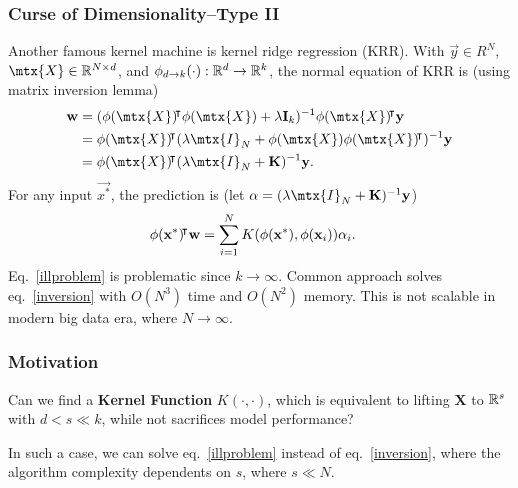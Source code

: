 \documentclass[10pt]{../formats/RU}
\begin{document}
\begin{frame}
  \frametitle{Curse of Dimensionality--Type II}
  Another famous kernel machine is kernel ridge regression (KRR). With $\vec{y}\in R^N$, $\mtx{X}\in\R^{N\times d}$, and $\phi_{d\rightarrow k}(\cdot):\mathbb{R}^d\rightarrow\mathbb{R}^k$,
  the normal equation of KRR is (using matrix inversion lemma)
  \begin{align}
    \vec{w} &= (\phi(\mtx{X})\trn\phi(\mtx{X})+\lambda\mathbf{I}_k)^{-1}\phi(\mtx{X})\trn\vec{y} \label{illproblem} \\
    &= \phi(\mtx{X})\trn(\lambda\mtx{I}_N+\phi(\mtx{X})\phi(\mtx{X})\trn)^{-1}\vec{y} \label{inversion}\\
    &= \phi(\mtx{X})\trn(\lambda\mtx{I}_N+\mathbf{K})^{-1}\vec{y}.
  \end{align}
  For any input $\vec{x^*}$, the prediction is (let $\vec{\alpha}=(\lambda\mtx{I}_N+\mathbf{K})^{-1}\vec{y}$)
  \begin{align}
    \phi(\mathbf{x^*}){}^{\mkern-4mu\intercal}\mathbf{w}
    &= \sum_{i=1}^{N}K(\phi(\mathbf{x^*}), \phi(\mathbf{x}_i))\mathbf{\alpha}_i.
  \end{align}
  Eq.~\eqref{illproblem} is problematic since $k\rightarrow\infty$. Common approach solves eq.~\eqref{inversion} with $O(N^3)$ time and $O(N^2)$ memory. This is not scalable in modern big data era, where $N\rightarrow\infty$.
\end{frame}
\begin{frame}
  \frametitle{Motivation}
  Can we find a \textbf{Kernel Function} $K(\cdot, \cdot)$, which is equivalent to lifting $\mathbf{X}$ to $\mathbb{R}^s$ with $d < s\ll k$, while not sacrifices model performance?

  In such a case, we can solve eq.~\eqref{illproblem} instead of eq.~\eqref{inversion}, where the algorithm complexity dependents on $s$, where $s\ll N$.
\end{frame}
\end{document}
